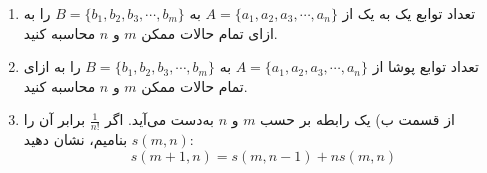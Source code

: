 \EXERCISE
\begin{enumerate}
\item
تعداد توابع یک به یک از
$A = \{a_1, a_2, a_3, \cdots, a_n\}$
به
$B = \{b_1, b_2, b_3, \cdots, b_m\}$
را به ازای تمام حالات ممکن
$m$
و
$n$
محاسبه کنید.
\item
تعداد توابع پوشا از
$A = \{a_1, a_2, a_3, \cdots, a_n\}$
به
$B = \{b_1, b_2, b_3, \cdots, b_m\}$
را به ازای تمام حالات ممکن
$m$
و
$n$
محاسبه کنید.
\item
از قسمت ب) یک رابطه بر حسب
$m$
و
$n$
به‌دست می‌آید. اگر
$\frac{1}{n!}$
برابر آن را
$s(m, n)$
بنامیم، نشان دهید:
$$s(m + 1, n) = s(m, n - 1) + ns(m, n)$$
\end{enumerate}